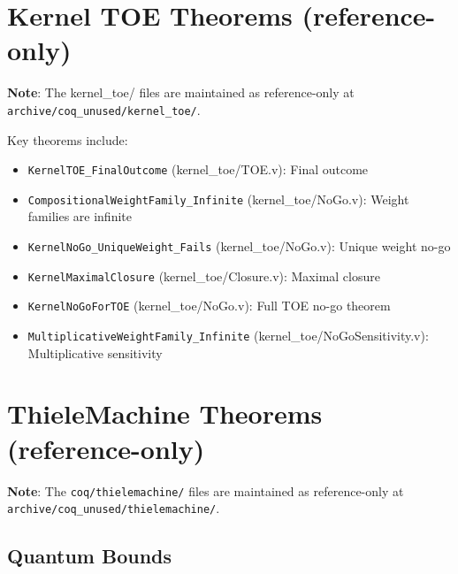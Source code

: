 \section{Kernel TOE Theorems (reference-only)}

\textbf{Note}: The kernel\_toe/ files are maintained as reference-only at \texttt{archive/coq\_unused/kernel\_toe/}.

Key theorems include:
\begin{itemize}
    \item \texttt{KernelTOE\_FinalOutcome} (kernel\_toe/TOE.v): Final outcome
    \item \texttt{CompositionalWeightFamily\_Infinite} (kernel\_toe/NoGo.v): Weight families are infinite
    \item \texttt{KernelNoGo\_UniqueWeight\_Fails} (kernel\_toe/NoGo.v): Unique weight no-go
    \item \texttt{KernelMaximalClosure} (kernel\_toe/Closure.v): Maximal closure
    \item \texttt{KernelNoGoForTOE} (kernel\_toe/NoGo.v): Full TOE no-go theorem
    \item \texttt{MultiplicativeWeightFamily\_Infinite} (kernel\_toe/NoGoSensitivity.v): Multiplicative sensitivity
\end{itemize}

\section{ThieleMachine Theorems (reference-only)}

\textbf{Note}: The \texttt{coq/thielemachine/} files are maintained as reference-only at \texttt{archive/coq\_unused/thielemachine/}.

\subsection{Quantum Bounds}

